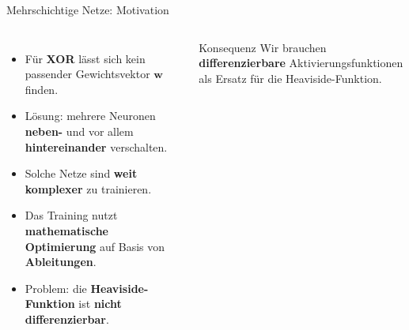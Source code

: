 \begin{frame}{Mehrschichtige Netze: Motivation}
\begin{columns}
\begin{itemize}
  \item Für \textbf{XOR} lässt sich kein passender Gewichtsvektor $\mathbf{w}$ finden.
  \item Lösung: mehrere Neuronen \textbf{neben-} und vor allem
        \textbf{hintereinander} verschalten.
  \item Solche Netze sind \textbf{weit komplexer} zu trainieren.
  \item Das Training nutzt \textbf{mathematische Optimierung} auf Basis von
        \textbf{Ableitungen}.
  \item Problem: die \textbf{Heaviside-Funktion} ist \textbf{nicht
        differenzierbar}.
\end{itemize}

\begin{blockC1}{Konsequenz}
Wir brauchen \textbf{differenzierbare} Aktivierungsfunktionen als Ersatz für
die Heaviside-Funktion.
\end{blockC1}
\end{columns}
\end{frame}

